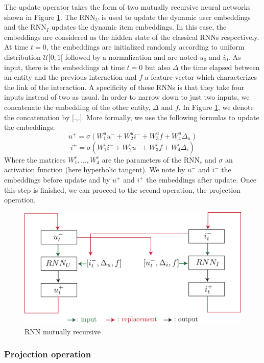 The update operator takes the form of two mutually recursive neural networks shown in Figure \ref{recursive RNNs}. The RNN$_U$ is used to update the dynamic user embeddings and the RNN$_I$ updates the dynamic item embeddings. In this case, the embeddings are considered as the hidden state of the classical RNNs respectively. At time $t=0$, the embeddings are initialized randomly according to uniform distribution $\mathcal{U}[0;1[$ followed by a normalization and are noted $u_0$ and $i_0$. As input, there is the embeddings at time $t=0$ but also $\Delta$ the time elapsed between an entity and the previous interaction and $f$ a feature vector which characterizes the link of the interaction. A specificity of these RNNs is that they take four inputs instead of two as usual. In order to narrow down to just two inputs, we concatenate the embedding of the other entity, $\Delta$ and $f$. In Figure \ref{recursive RNNs}, we denote the concatenation by [.,.]. More formally, we use the following formulas to update the embeddings:
$$
u^+ = \sigma \left ( W_1^u u^- + W_2^u i^- + W_3^u f + W_4^u \Delta_u \right )
$$
$$
i^+ = \sigma \left ( W_1^i i^- + W_2^i u^- + W_3^i f + W_4^i \Delta_i \right )
$$
Where the matrices $W_1^e, ..., W_4^e$ are the parameters of the RNN$_e$ and $\sigma$ an activation function (here hyperbolic tangent). We note by $u^-$ and $i^-$ the embeddings before update and by $u^+$ and $i^+$ the embeddings after update. Once this step is finished, we can proceed to the second operation, the projection operation.

\begin{figure}[htbp]
   \centering
    \includegraphics[width=1.0\textwidth]{image/rnn_jodie.pdf}
    \caption{RNN mutually recursive}
    \label{recursive RNNs}
\end{figure}

\subsubsection{Projection operation}

